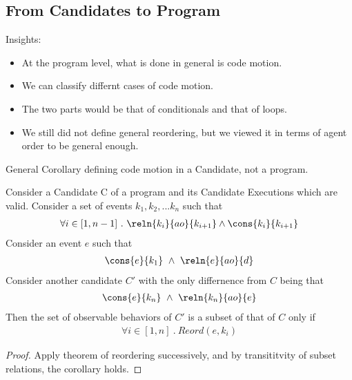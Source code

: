 \subsection{From Candidates to Program}

    Insights:
    \begin{itemize}
        \item At the program level, what is done in general is code motion. 
        \item We can classify differnt cases of code motion. 
        \item The two parts would be that of conditionals and that of loops.
        \item We still did not define general reordering, but we viewed it in terms of agent order to be general enough. 
    \end{itemize}

    General Corollary defining code motion in a Candidate, not a program. 
    \begin{corollary}
        Consider a Candidate C of a program and its Candidate Executions which are valid. Consider a set of events ${k_1, k_2, ... k_n}$ such that 
        \begin{align}
            \forall i \in [1,n-1] \ . \ \reln{k_i}{ao}{k_{i+1}} \wedge \cons{k_i}{k_{i+1}} 
        \end{align}
        Consider an event $e$ such that 
        \begin{align}
            \cons{e}{k_1} \ \wedge \ \reln{e}{ao}{d}  
        \end{align}
        Consider another candidate $C'$ with the only differnence from $C$ being that
        \begin{align}
            \cons{e}{k_n} \ \wedge \ \reln{k_n}{ao}{e}
        \end{align}
        Then the set of observable behaviors of $C'$ is a subset of that of $C$ only if 
        \begin{align}
            \forall i \in [1,n] \ . \ Reord(e,k_i)
        \end{align} 
    \end{corollary}

    \begin{proof}
        Apply theorem of reordering successively, and by transititvity of subset relations, the corollary holds.
    \end{proof}


